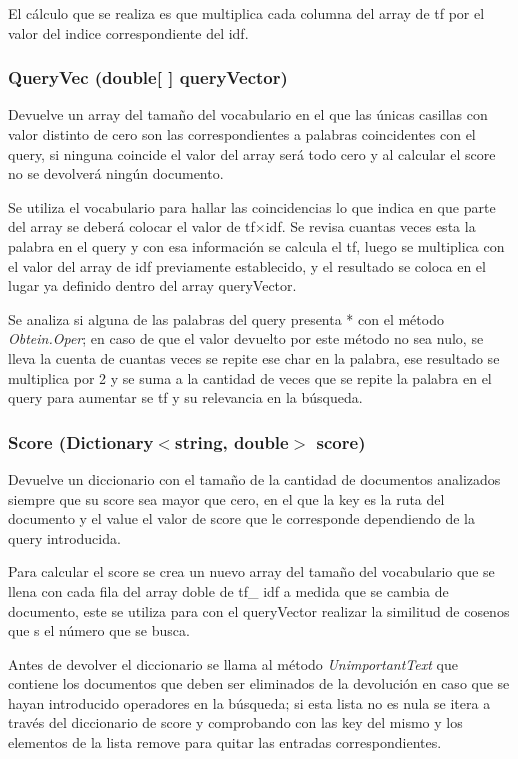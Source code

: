 \documentclass[a4paper,12pt,]{article}
\begin{document}
El cálculo que se realiza es que multiplica cada columna del array de tf por el valor del indice correspondiente 
del idf.

\subsubsection*{QueryVec (double[ ] queryVector)}
Devuelve un array del tamaño del vocabulario en el que las únicas casillas con valor distinto de cero son las 
correspondientes a palabras coincidentes con el query, si ninguna coincide el valor del array será todo cero y al 
calcular el score no se devolverá ningún documento.

Se utiliza el vocabulario para hallar las coincidencias lo que indica en que parte del array se deberá colocar el 
valor de tf$\times $idf. Se revisa cuantas veces esta la palabra en el query y con esa información se calcula el 
tf, luego se multiplica con el valor del array de idf previamente establecido, y el resultado se coloca en el 
lugar ya definido dentro del array queryVector.

Se analiza si alguna de las palabras del query presenta * con el método \textit{Obtein.Oper}; en caso de que el 
valor devuelto por este método no sea nulo, se lleva la cuenta de cuantas veces se repite ese char en la palabra, 
ese resultado se multiplica por 2 y se suma a la cantidad de veces que se repite la palabra en el query para 
aumentar se tf y su relevancia en la búsqueda.

\subsubsection*{Score (Dictionary$<$string, double$>$ score)}
Devuelve un diccionario con el tamaño de la cantidad de documentos analizados siempre que su score sea mayor que 
cero, en el que la key es la ruta del documento y el value el valor de score que le corresponde dependiendo de 
la query introducida.

Para calcular el score se crea un nuevo array del tamaño del vocabulario que se llena con cada fila del array 
doble de tf\_ idf a medida que se cambia de documento, este se utiliza para con el queryVector realizar la 
similitud de cosenos que s el número que se busca. 

Antes de devolver el diccionario se llama al método \textit{UnimportantText} que contiene los documentos que 
deben ser eliminados de la devolución en caso que se hayan introducido operadores en la búsqueda; si esta lista 
no es nula se itera a través del diccionario de score y comprobando con las key del mismo y los elementos de la 
lista remove para quitar las entradas correspondientes.
\end{document}
